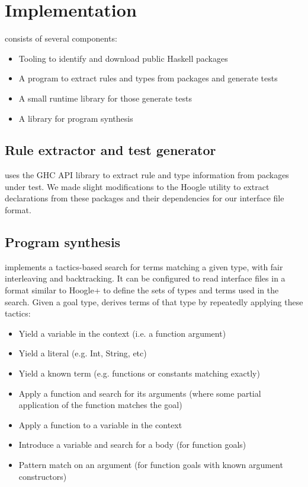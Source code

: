 \section{Implementation}
\label{sec:implementation}

\Rulecheck consists of several components:

\begin{itemize}
  \item Tooling to identify and download public Haskell packages
  \item A program to extract rules and types from packages and generate tests
  \item A small runtime library for those generate tests
  \item A library for program synthesis
\end{itemize}

\subsection{Rule extractor and test generator}

\Rulecheck uses the GHC API library to extract rule and type information from packages under test. We made slight modifications to the Hoogle utility to extract declarations from these packages and their dependencies for our interface file format.

\subsection{Program synthesis}

\Rulecheck implements a tactics-based search for terms matching a given type, with fair interleaving and backtracking. \cite{delahaye2000tactic, kiselyov2005backtracking} It can be configured to read interface files in a format similar to Hoogle+ \cite{james2020digging} to define the sets of types and terms used in the search. Given a goal type, \Rulecheck derives terms of that type by repeatedly applying these tactics:

\begin{itemize}
  \item Yield a variable in the context (i.e. a function argument)
  \item Yield a literal (e.g. Int, String, etc)
  \item Yield a known term (e.g. functions or constants matching exactly)
  \item Apply a function and search for its arguments (where some partial application of the function matches the goal)
  \item Apply a function to a variable in the context
  \item Introduce a variable and search for a body (for function goals)
  \item Pattern match on an argument (for function goals with known argument constructors)
\end{itemize}

